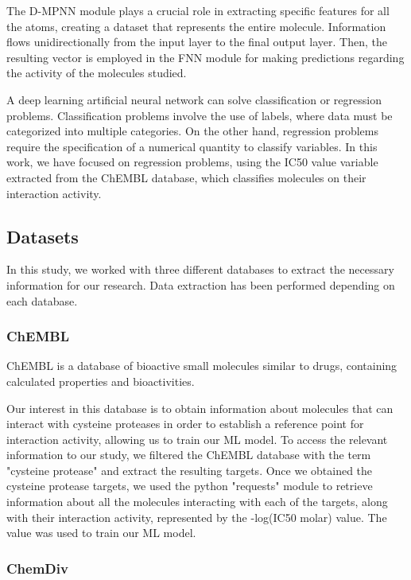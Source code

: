 \documentclass[final,times,twocolumn,article]{elsarticle}
\begin{document}
The D-MPNN module plays a crucial role in extracting specific features for all the atoms, creating a dataset that represents the entire molecule. Information flows unidirectionally from the input layer to the final output layer. Then, the resulting vector is employed in the FNN module for making predictions regarding the activity of the molecules studied. \cite{Wang2022}

A deep learning artificial neural network can solve classification or regression problems. Classification problems involve the use of labels, where data must be categorized into multiple categories. On the other hand, regression problems require the specification of a numerical quantity to classify variables. In this work, we have focused on regression problems, using the IC50 value variable extracted from the ChEMBL database, which classifies molecules on their interaction activity. 

\subsection{Datasets}

In this study, we worked with three different databases to extract the necessary information for our research. Data extraction has been performed depending on each database.  

\subsubsection{ChEMBL}

ChEMBL is a database of bioactive small molecules similar to drugs, containing calculated properties and bioactivities. \cite{chemblweb}

Our interest in this database is to obtain information about molecules that can interact with cysteine proteases in order to establish a reference point for interaction activity, allowing us to train our ML model. To access the relevant information to our study, we filtered the ChEMBL database with the term "cysteine protease" and extract the resulting targets. Once we obtained the cysteine protease targets, we used the python "requests" module to retrieve information about all the molecules interacting with each of the targets, along with their interaction activity, represented by the -log(IC50 molar) value. The value was used to train our ML model. 

\subsubsection{ChemDiv}
\end{document}
